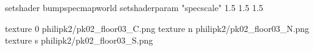 setshader bumpspecmapworld
setshaderparam "specscale" 1.5 1.5 1.5

texture 0 philipk2/pk02_floor03_C.png
texture n philipk2/pk02_floor03_N.png
texture s philipk2/pk02_floor03_S.png

